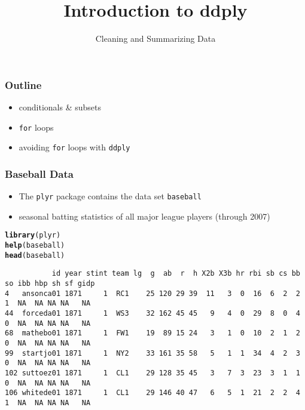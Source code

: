 \documentclass{beamer}\usepackage[]{graphicx}\usepackage[]{color}
\title[3-Intro to ddply]{Introduction to ddply}
\subtitle{Cleaning and Summarizing Data}
\date{\hspace{1in}}
\institute[ISU]{Iowa State University}
\makeatletter
\newcommand{\hlstd}[1]{\textcolor[rgb]{0.345,0.345,0.345}{#1}}%
\newcommand{\hlkwd}[1]{\textcolor[rgb]{0.737,0.353,0.396}{\textbf{#1}}}%
\newenvironment{kframe}{%
 \def\at@end@of@kframe{}%
 \ifinner\ifhmode%
  \def\at@end@of@kframe{\end{minipage}}%
  \begin{minipage}{\columnwidth}%
 \fi\fi%
 \def\FrameCommand##1{\hskip\@totalleftmargin \hskip-\fboxsep
 \colorbox{shadecolor}{##1}\hskip-\fboxsep
     \hskip-\linewidth \hskip-\@totalleftmargin \hskip\columnwidth}%
 \MakeFramed {\advance\hsize-\width
   \@totalleftmargin\z@ \linewidth\hsize
   \@setminipage}}%
 {\par\unskip\endMakeFramed%
 \at@end@of@kframe}
\newenvironment{knitrout}{}{} %
\makeatother
\begin{document}
\begin{frame}
\maketitle
\end{frame}



\begin{frame}
\frametitle{Outline}
\begin{itemize}
\item conditionals \& subsets\medskip
\item \texttt{for} loops\medskip
\item avoiding \texttt{for} loops with \texttt{ddply}\medskip
\end{itemize}
\end{frame}


\begin{frame}[fragile]
\frametitle{Baseball Data}
\begin{itemize}
\item The \texttt{plyr} package contains the data set \texttt{baseball}
\item seasonal batting statistics of all major league players (through 2007)
\end{itemize}
\begin{knitrout}\scriptsize
{}\color{fgcolor}\begin{kframe}
\begin{alltt}
\hlkwd{library}\hlstd{(plyr)}
\hlkwd{help}\hlstd{(baseball)}
\hlkwd{head}\hlstd{(baseball)}
\end{alltt}
\end{kframe}
\end{knitrout}
\begin{knitrout}\tiny
{}\color{fgcolor}\begin{kframe}
\begin{verbatim}
           id year stint team lg  g  ab  r  h X2b X3b hr rbi sb cs bb so ibb hbp sh sf gidp
4   ansonca01 1871     1  RC1    25 120 29 39  11   3  0  16  6  2  2  1  NA  NA NA NA   NA
44  forceda01 1871     1  WS3    32 162 45 45   9   4  0  29  8  0  4  0  NA  NA NA NA   NA
68  mathebo01 1871     1  FW1    19  89 15 24   3   1  0  10  2  1  2  0  NA  NA NA NA   NA
99  startjo01 1871     1  NY2    33 161 35 58   5   1  1  34  4  2  3  0  NA  NA NA NA   NA
102 suttoez01 1871     1  CL1    29 128 35 45   3   7  3  23  3  1  1  0  NA  NA NA NA   NA
106 whitede01 1871     1  CL1    29 146 40 47   6   5  1  21  2  2  4  1  NA  NA NA NA   NA
\end{verbatim}
\end{kframe}
\end{knitrout}
\end{frame}
\end{document}
